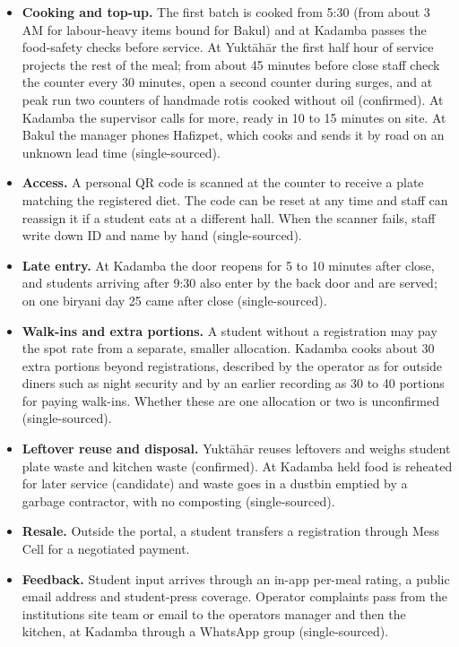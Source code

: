 \documentclass[
  10pt,
  table]{article}
\begin{document}
\begin{itemize}
\item
  \textbf{Cooking and top-up.} The first batch is cooked from 5:30 (from about 3 AM for labour-heavy items bound for Bakul) and at Kadamba passes the food-safety checks before service. At Yuktāhār the first half hour of service projects the rest of the meal; from about 45 minutes before close staff check the counter every 30 minutes, open a second counter during surges, and at peak run two counters of handmade rotis cooked without oil (confirmed). At Kadamba the supervisor calls for more, ready in 10 to 15 minutes on site. At Bakul the manager phones Hafizpet, which cooks and sends it by road on an unknown lead time (single-sourced).
\item
  \textbf{Access.} A personal QR code is scanned at the counter to receive a plate matching the registered diet. The code can be reset at any time and staff can reassign it if a student eats at a different hall. When the scanner fails, staff write down ID and name by hand (single-sourced).
\item
  \textbf{Late entry.} At Kadamba the door reopens for 5 to 10 minutes after close, and students arriving after 9:30 also enter by the back door and are served; on one biryani day 25 came after close (single-sourced).
\item
  \textbf{Walk-ins and extra portions.} A student without a registration may pay the spot rate from a separate, smaller allocation. Kadamba cooks about 30 extra portions beyond registrations, described by the operator as for outside diners such as night security and by an earlier recording as 30 to 40 portions for paying walk-ins. Whether these are one allocation or two is unconfirmed (single-sourced).
\item
  \textbf{Leftover reuse and disposal.} Yuktāhār reuses leftovers and weighs student plate waste and kitchen waste (confirmed). At Kadamba held food is reheated for later service (candidate) and waste goes in a dustbin emptied by a garbage contractor, with no composting (single-sourced).
\item
  \textbf{Resale.} Outside the portal, a student transfers a registration through Mess Cell for a negotiated payment.
\item
  \textbf{Feedback.} Student input arrives through an in-app per-meal rating, a public email address and student-press coverage. Operator complaints pass from the institution\textquotesingle s site team or email to the operator\textquotesingle s manager and then the kitchen, at Kadamba through a WhatsApp group (single-sourced).
\end{itemize}
\end{document}
